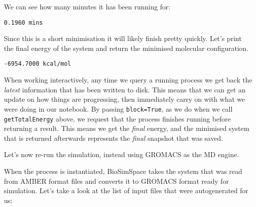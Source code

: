 We can see how many minutes it has been running for:

\begin{Shaded}
\begin{Highlighting}[]
\end{Highlighting}
\end{Shaded}

\begin{verbatim}
0.1960 mins
\end{verbatim}

Since this is a short minimisation it will likely finish pretty quickly.
Let's print the final energy of the system and return the minimised
molecular configuration.

\begin{Shaded}
\begin{Highlighting}[]
\OperatorTok{=}\NormalTok{))}
\OperatorTok{=}
\end{Highlighting}
\end{Shaded}

\begin{verbatim}
-6954.7000 kcal/mol
\end{verbatim}

When working interactively, any time we query a running process we get
back the \emph{latest} information that has been written to disk. This
means that we can get an update on how things are progressing, then
immediately carry on with what we were doing in our notebook. By passing
\texttt{block=True}, as we do when we call \texttt{getTotalEnergy}
above, we request that the process finishes running before returning a
result. This means we get the \emph{final} energy, and the minimised
system that is returned afterwards represents the \emph{final} snapshot
that was saved.

Let's now re-run the simulation, instead using GROMACS as the MD engine.

\begin{Shaded}
\begin{Highlighting}[]
\OperatorTok{=}
\end{Highlighting}
\end{Shaded}

When the process is instantiated, BioSimSpace takes the system that was
read from AMBER format files and converts it to GROMACS format ready for
simulation. Let's take a look at the list of input files that were
autogenerated for us:

